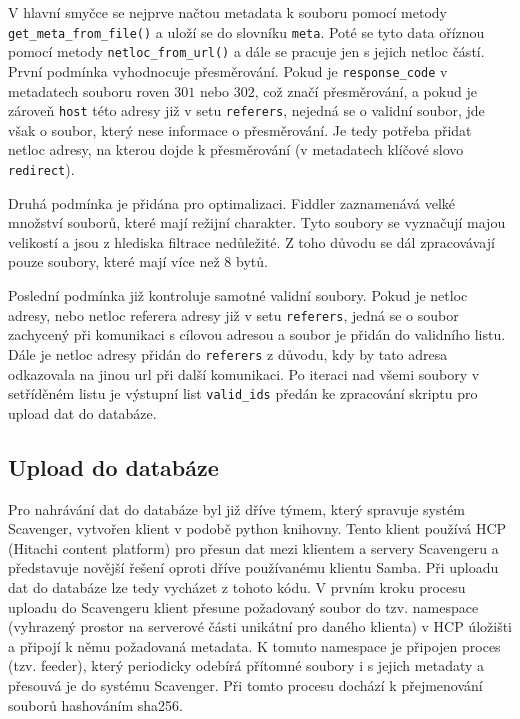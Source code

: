 \documentclass[thesis=M,czech,hidelinks]{FITthesis}[2013/05/06]
\begin{document}
V hlavní smyčce se nejprve načtou metadata k souboru pomocí metody \texttt{get_meta_from_file()} a uloží se do slovníku \texttt{meta}. Poté se tyto data oříznou pomocí metody \texttt{netloc_from_url()} a dále se pracuje jen s jejich netloc částí. První podmínka vyhodnocuje přesměrování. Pokud je \texttt{response_code} v metadatech souboru roven $301$ nebo $302$, což značí přesměrování, a pokud je zároveň \texttt{host} této adresy již v setu \texttt{referers}, nejedná se o validní soubor, jde však o soubor, který nese informace o přesměrování. Je tedy potřeba přidat netloc adresy, na kterou dojde k přesměrování (v metadatech klíčové slovo \texttt{redirect}). 

Druhá podmínka je přidána pro optimalizaci. Fiddler zaznamenává velké množství souborů, které mají režijní charakter. Tyto soubory se vyznačují majou velikostí a jsou z hlediska filtrace nedůležité. Z toho důvodu se dál zpracovávají pouze soubory, které mají více než 8 bytů.

Poslední podmínka již kontroluje samotné validní soubory. Pokud je netloc adresy, nebo netloc referera adresy již v setu \texttt{referers}, jedná se o soubor zachycený při komunikaci s cílovou adresou a soubor je přidán do validního listu. Dále je netloc adresy přidán do \texttt{referers} z důvodu, kdy by tato adresa odkazovala na jinou url při další komunikaci. Po iteraci nad všemi soubory v setříděném listu je výstupní list \texttt{valid_ids} předán ke zpracování skriptu pro upload dat do databáze.





\subsection{Upload do databáze} \label{sec:upload}
Pro nahrávání dat do databáze byl již dříve týmem, který spravuje systém Scavenger, vytvořen klient v podobě python knihovny. Tento klient používá HCP (Hitachi content platform) pro přesun dat mezi klientem a servery Scavengeru a představuje novější řešení oproti dříve používanému klientu Samba. Při uploadu dat do databáze lze tedy vycházet z tohoto kódu. V prvním kroku procesu uploadu do Scavengeru klient přesune požadovaný soubor do tzv. namespace (vyhrazený prostor na serverové části unikátní pro daného klienta) v HCP úložišti a připojí k němu požadovaná metadata. K tomuto namespace je připojen proces (tzv. feeder), který periodicky odebírá přítomné soubory i s jejich metadaty a přesouvá je do systému Scavenger. Při tomto procesu dochází k přejmenování souborů hashováním sha256.
\end{document}
